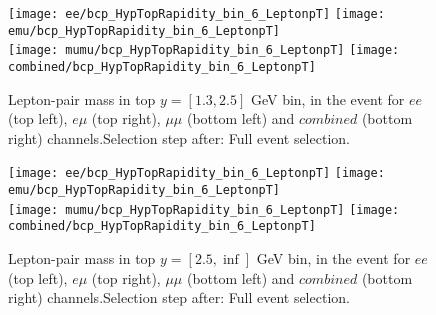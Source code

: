 \documentclass[12pt, a4paper, titlepage]{article}
\begin{document}
\clearpage
\newpage
\begin{figure}
  \texttt{[image: ee/bcp\_HypTopRapidity\_bin\_6\_LeptonpT]}
  \texttt{[image: emu/bcp\_HypTopRapidity\_bin\_6\_LeptonpT]}\\
  \texttt{[image: mumu/bcp\_HypTopRapidity\_bin\_6\_LeptonpT]}
  \texttt{[image: combined/bcp\_HypTopRapidity\_bin\_6\_LeptonpT]}
\caption{Lepton-pair mass in top $y = [1.3,2.5]$ GeV bin, in the event for $ee$ (top left), $e\mu$ (top right), $\mu\mu$ (bottom left) and $combined$ (bottom right) channels.\newline Selection step after: Full event selection.}
\end{figure}

\clearpage
\newpage
\begin{figure}
  \texttt{[image: ee/bcp\_HypTopRapidity\_bin\_6\_LeptonpT]}
  \texttt{[image: emu/bcp\_HypTopRapidity\_bin\_6\_LeptonpT]}\\
  \texttt{[image: mumu/bcp\_HypTopRapidity\_bin\_6\_LeptonpT]}
  \texttt{[image: combined/bcp\_HypTopRapidity\_bin\_6\_LeptonpT]}
\caption{Lepton-pair mass in top $y = [2.5,\inf]$ GeV bin, in the event for $ee$ (top left), $e\mu$ (top right), $\mu\mu$ (bottom left) and $combined$ (bottom right) channels.\newline Selection step after: Full event selection.}
\end{figure}

\clearpage
\newpage





% 
% 
\end{document}
